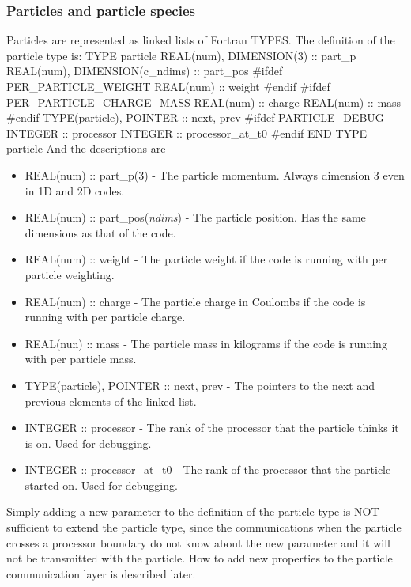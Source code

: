 \documentclass[12pt,a4paper]{article}
\newenvironment{boxverbatim}{\lboxverbatim{none}}{\endlboxverbatim}
\begin{document}
\subsubsection{Particles and particle species}
Particles are represented as linked lists of Fortran TYPES. The definition of
the particle type is:
\begin{boxverbatim}
  TYPE particle
    REAL(num), DIMENSION(3) :: part_p
    REAL(num), DIMENSION(c_ndims) :: part_pos
#ifdef PER_PARTICLE_WEIGHT
    REAL(num) :: weight
#endif
#ifdef PER_PARTICLE_CHARGE_MASS
    REAL(num) :: charge
    REAL(num) :: mass
#endif
    TYPE(particle), POINTER :: next, prev
#ifdef PARTICLE_DEBUG
    INTEGER :: processor
    INTEGER :: processor_at_t0
#endif
  END TYPE particle
\end{boxverbatim}
And the descriptions are
\begin{itemize}
\item REAL(num) :: part\_p(3) - The particle momentum. Always dimension 3 even
  in 1D and 2D codes.
\item REAL(num) :: part\_pos({\it ndims}) - The particle position. Has
  the same dimensions as that of the code.
\item REAL(num) :: weight - The particle weight if the code is running with
  per particle weighting.
\item REAL(num) :: charge - The particle charge in Coulombs if the code is
  running with per particle charge.
\item REAL(nun) :: mass - The particle mass in kilograms if the code is
  running with per particle mass.
\item TYPE(particle), POINTER :: next, prev - The pointers to the next and
  previous elements of the linked list.
\item INTEGER :: processor - The rank of the processor that the particle
  thinks it is on. Used for debugging.
\item INTEGER :: processor\_at\_t0 - The rank of the processor that the
  particle started on. Used for debugging.
\end{itemize}
Simply adding a new parameter to the definition of the particle type is NOT
sufficient to extend the particle type, since the communications when the
particle crosses a processor boundary do not know about the new parameter and
it will not be transmitted with the particle. How to add new properties to the
particle communication layer is described later.\\
\end{document}
